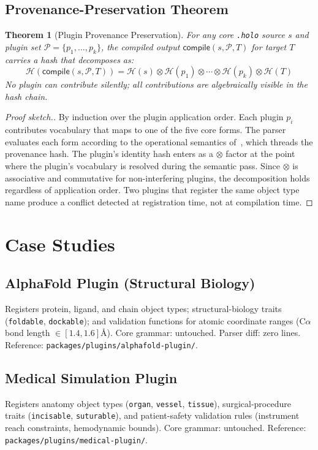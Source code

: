 \documentclass[sigconf,nonacm]{acmart}
\providecommand{\compilefn}{\mathsf{compile}}
\newcommand{\holo}{\texttt{.holo}}
\newcommand{\hashfn}{\mathcal{H}}
\newcommand{\tropmult}{\otimes}
\newtheorem{theorem}{Theorem}
\begin{document}
\subsection{Provenance-Preservation Theorem}
\begin{theorem}[Plugin Provenance Preservation]
For any core \holo{} source $s$ and plugin set
$\mathcal{P} = \{p_1, \ldots, p_k\}$, the compiled output
$\compilefn(s, \mathcal{P}, T)$ for target $T$ carries a
hash that decomposes as:
$$\hashfn(\compilefn(s, \mathcal{P}, T)) =
  \hashfn(s) \tropmult
  \hashfn(p_1) \tropmult \cdots \tropmult \hashfn(p_k)
  \tropmult \hashfn(T)$$
No plugin can contribute silently; all contributions are
algebraically visible in the hash chain.
\end{theorem}

\begin{proof}[Proof sketch.]
By induction over the plugin application order. Each
plugin $p_i$ contributes vocabulary that maps to one of the
five core forms. The parser evaluates each form according to
the operational semantics of~\cite{paper-10-hs-core-pldi2027},
which threads the provenance hash. The plugin's identity hash
enters as a $\tropmult$ factor at the point where the
plugin's vocabulary is resolved during the semantic pass.
Since $\tropmult$ is associative and commutative for
non-interfering plugins, the decomposition holds regardless
of application order. Two plugins that register the same
object type name produce a conflict detected at registration
time, not at compilation time.
\end{proof}

\section{Case Studies}
\label{sec:cases}

\subsection{AlphaFold Plugin (Structural Biology)}
Registers protein, ligand, and chain object types;
structural-biology traits (\texttt{foldable},
\texttt{dockable}); and validation functions for atomic
coordinate ranges (C$\alpha$ bond length $\in [1.4, 1.6]$\AA).
Core grammar: untouched. Parser diff: zero lines.
Reference: \texttt{packages/plugins/alphafold-plugin/}.

\subsection{Medical Simulation Plugin}
Registers anatomy object types (\texttt{organ},
\texttt{vessel}, \texttt{tissue}), surgical-procedure traits
(\texttt{incisable}, \texttt{suturable}), and patient-safety
validation rules (instrument reach constraints, hemodynamic
bounds). Core grammar: untouched.
Reference: \texttt{packages/plugins/medical-plugin/}.
\end{document}
